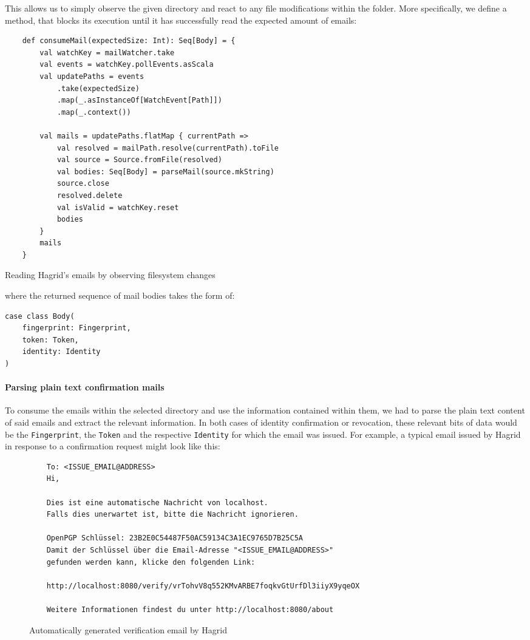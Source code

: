 This allows us to simply observe the given directory and react to any file modifications within the folder.
More specifically, we define a method, that blocks its execution until it has successfully read the expected amount of emails: 
\begin{code}
    \begin{verbatim}
    def consumeMail(expectedSize: Int): Seq[Body] = {
        val watchKey = mailWatcher.take
        val events = watchKey.pollEvents.asScala
        val updatePaths = events
            .take(expectedSize)
            .map(_.asInstanceOf[WatchEvent[Path]])
            .map(_.context())
    
        val mails = updatePaths.flatMap { currentPath =>
            val resolved = mailPath.resolve(currentPath).toFile
            val source = Source.fromFile(resolved)
            val bodies: Seq[Body] = parseMail(source.mkString)
            source.close
            resolved.delete
            val isValid = watchKey.reset
            bodies
        }
        mails
    }
    \end{verbatim}
    \caption{Reading Hagrid's emails by observing filesystem changes}
\end{code}
\label{code:consumeMail}
where the returned sequence of mail bodies takes the form of:
\begin{verbatim}
case class Body(
    fingerprint: Fingerprint, 
    token: Token, 
    identity: Identity
)
\end{verbatim}

\paragraph{Parsing plain text confirmation mails}
To consume the emails within the selected directory and use the information contained within them, we had to parse the plain text content of said emails and extract the relevant information. In both cases of identity confirmation or revocation, these relevant bits of data would be the \texttt{Fingerprint}, the \texttt{Token} and the respective \texttt{Identity} for which the email was issued. For example, a typical email issued by Hagrid in response to a confirmation request might look like this: 
\begin{figure}[H]
    \begin{verbatim}
    To: <ISSUE_EMAIL@ADDRESS> 
    Hi,
    
    Dies ist eine automatische Nachricht von localhost.
    Falls dies unerwartet ist, bitte die Nachricht ignorieren.

    OpenPGP Schlüssel: 23B2E0C54487F50AC59134C3A1EC9765D7B25C5A 
    Damit der Schlüssel über die Email-Adresse "<ISSUE_EMAIL@ADDRESS>" 
    gefunden werden kann, klicke den folgenden Link:
    
    http://localhost:8080/verify/vrTohvV8q552KMvARBE7foqkvGtUrfDl3iiyX9yqeOX 
    
    Weitere Informationen findest du unter http://localhost:8080/about
    \end{verbatim}
    \caption{Automatically generated verification email by Hagrid}
\end{figure}

